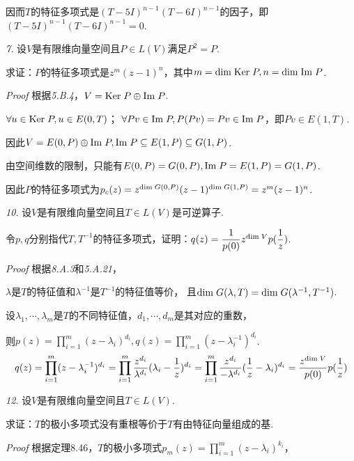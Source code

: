 因而\(T\)的特征多项式是\((T-5I)^{n-1}(T-6I)^{n-1}\)的因子，即\((T-5I)^{n-1}(T-6I)^{n-1}=0\).

\hspace*{\fill}

\textit{7.}
设\(V\)是有限维向量空间且\(P \in L(V)\)满足\(P^2=P\).

求证：\(P\)的特征多项式是\(z^m(z-1)^n\)，其中\(m=\mathrm{dim \;} \mathrm{Ker \;} P,n=\mathrm{dim \;} \mathrm{Im \;} P\).

\textit{Proof}
根据\textit{5.B.4}，\(V=\mathrm{Ker \;} P \oplus \mathrm{Im \;} P\).

\(\forall u \in \mathrm{Ker \;} P,u \in E(0,T)\)；
\(\forall Pv \in \mathrm{Im \;} P,P(Pv)=Pv \in \mathrm{Im \;} P\)，即\(Pv \in E(1,T)\).

因此\(V=E(0,P) \oplus \mathrm{Im \;} P,\mathrm{Im \;} P \subseteq E(1,P) \subseteq G(1,P)\).

由空间维数的限制，只能有\(E(0,P)=G(0,P),\mathrm{Im \;} P=E(1,P)=G(1,P)\).

因此\(P\)的特征多项式为\(p_c(z)=z^{\mathrm{dim \;} G(0,P)}(z-1)^{\mathrm{dim \;} G(1,P)}=z^m(z-1)^n\).

\newpage

\textit{10.}
设\(V\)是有限维向量空间且\(T \in L(V)\)是可逆算子.

令\(p,q\)分别指代\(T,T^{-1}\)的特征多项式，证明：\(q(z)=\dfrac{1}{p(0)}z^{\mathrm{dim \;} V}p(\dfrac{1}{z})\).

\textit{Proof}
根据\textit{8.A.3}和\textit{5.A.21}，

\(\lambda\)是\(T\)的特征值和\(\lambda^{-1}\)是\(T^{-1}\)的特征值等价，
且\(\mathrm{dim \;} G(\lambda,T)=\mathrm{dim \;} G(\lambda^{-1},T^{-1})\).

设\(\lambda_1,\cdots,\lambda_m\)是\(T\)的不同特征值，\(d_1,\cdots,d_m\)是其对应的重数，

则\(p(z)=\prod_{i=1}^m (z-\lambda_i)^{d_i},q(z)=\prod_{i=1}^m (z-\lambda_i^{-1})^{d_i}\).
    \begin{align*}
        q(z)=\prod_{i=1}^m (z-\lambda_i^{-1})^{d_i}
            =\prod_{i=1}^m \dfrac{z^{d_i}}{\lambda^{d_i}}(\lambda_i-\dfrac{1}{z})^{d_i}
            =\prod_{i=1}^m \dfrac{z^{d_i}}{-\lambda^{d_i}}(\dfrac{1}{z}-\lambda_i)^{d_i}
            =\dfrac{z^{\mathrm{dim \;} V}}{p(0)}p(\dfrac{1}{z})
    \end{align*}

\hspace*{\fill}

\textit{12.}
设\(V\)是有限维向量空间且\(T \in L(V)\).

求证：\(T\)的极小多项式没有重根等价于\(T\)有由特征向量组成的基.

\textit{Proof}
根据定理8.46，\(T\)的极小多项式\(p_m(z)=\prod_{i=1}^m (z-\lambda_i)^{k_i}\)，

